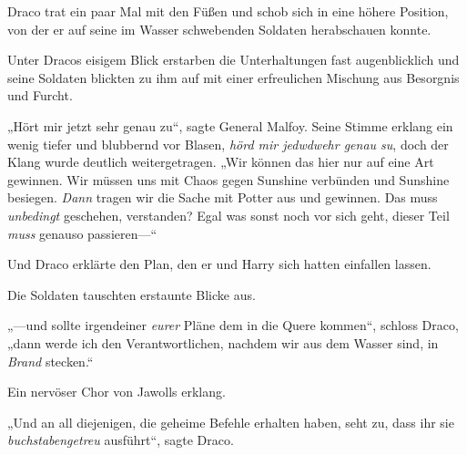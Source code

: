 Draco trat ein paar Mal mit den Füßen und schob sich in eine höhere Position, von der er auf seine im Wasser schwebenden Soldaten herabschauen konnte.

Unter Dracos eisigem Blick erstarben die Unterhaltungen fast augenblicklich und seine Soldaten blickten zu ihm auf mit einer erfreulichen Mischung aus Besorgnis und Furcht.

„Hört mir jetzt sehr genau zu“, sagte General Malfoy. Seine Stimme erklang ein wenig tiefer und blubbernd vor Blasen, \emph{hörd mir jedwdwehr genau su}, doch der Klang wurde deutlich weitergetragen. „Wir können das hier nur auf eine Art gewinnen. Wir müssen uns mit Chaos gegen Sunshine verbünden und Sunshine besiegen. \emph{Dann} tragen wir die Sache mit Potter aus und gewinnen. Das muss \emph{unbedingt} geschehen, verstanden? Egal was sonst noch vor sich geht, dieser Teil \emph{muss} genauso passieren—“

Und Draco erklärte den Plan, den er und Harry sich hatten einfallen lassen.

Die Soldaten tauschten erstaunte Blicke aus.

„—und sollte irgendeiner \emph{eurer} Pläne dem in die Quere kommen“, schloss Draco, „dann werde ich den Verantwortlichen, nachdem wir aus dem Wasser sind, in \emph{Brand} stecken.“

Ein nervöser Chor von Jawolls erklang.

„Und an all diejenigen, die geheime Befehle erhalten haben, seht zu, dass ihr sie \emph{buchstabengetreu} ausführt“, sagte Draco.

